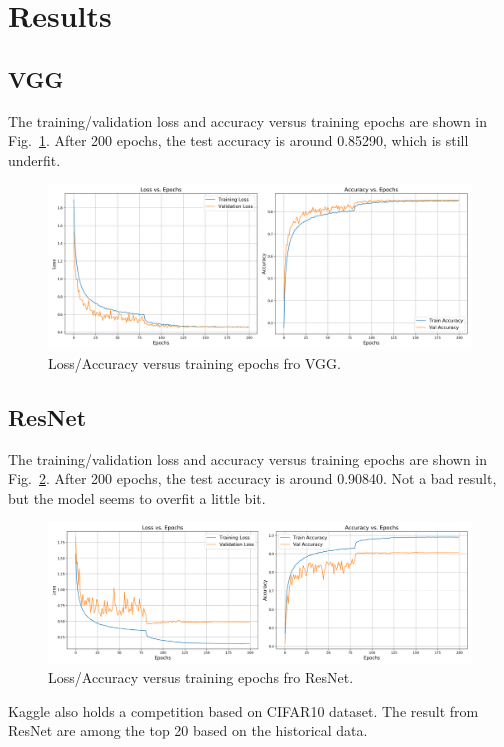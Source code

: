 \section{Results}

\subsection{VGG}
The training/validation loss and accuracy versus training epochs are shown in Fig.~\ref{fig:vgg_loss}. After 200 epochs, the test accuracy is around 0.85290, which is still underfit.

\begin{figure}[htbp]
\centering
\includegraphics[width=1.0\textwidth]{./figures/vgg_loss.png}
\caption{Loss/Accuracy versus training epochs fro VGG.}
\label{fig:vgg_loss} 
\end{figure}



\subsection{ResNet}

The training/validation loss and accuracy versus training epochs are shown in Fig.~\ref{fig:resnet_loss}. After 200 epochs, the test accuracy is around 0.90840. Not a bad result, but the model seems to overfit a little bit.

\begin{figure}[htbp]
\centering
\includegraphics[width=1.0\textwidth]{./figures/resnet_loss.png}
\caption{Loss/Accuracy versus training epochs fro ResNet.}
\label{fig:resnet_loss} 
\end{figure}


Kaggle also holds a competition based on CIFAR10 dataset.  The result from ResNet are among the top 20 based on the historical data.


\clearpage

%
%
%




